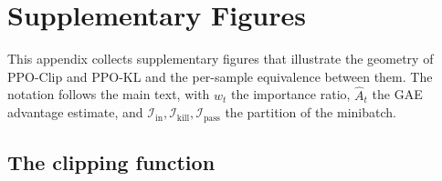 \documentclass{article}
\begin{document}
\clearpage
\section{Supplementary Figures}
\label{app:figures}

This appendix collects supplementary figures that illustrate the
geometry of PPO-Clip and PPO-KL and the per-sample equivalence between
them. The notation follows the main text, with $w_t$ the importance
ratio, $\hat{A}_t$ the GAE advantage estimate, and
$\mathcal{I}_{\text{in}}, \mathcal{I}_{\text{kill}},
\mathcal{I}_{\text{pass}}$ the partition of the minibatch.

\subsection{The clipping function}
\end{document}
